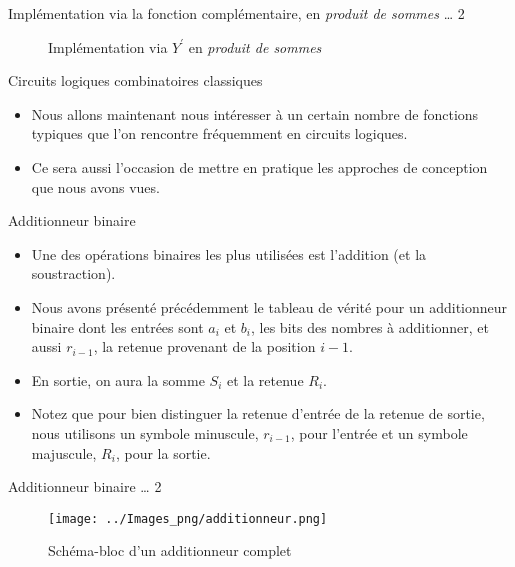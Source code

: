 \documentclass[presentation]{beamer}
\begin{document}
\begin{frame}[label={sec:orgec8a9b9}]{Implémentation via la fonction complémentaire, en \emph{produit de sommes} \ldots{} 2}
\begin{figure}[htbp]
\centering

\caption{\label{fig:org5e15c6f}Implémentation via \(Y^\prime\) en \emph{produit de sommes}}
\end{figure} 
\end{frame}

\begin{frame}[label={sec:org08b1494}]{Circuits logiques combinatoires classiques}
\begin{itemize}
\item Nous allons maintenant nous intéresser à un certain nombre de fonctions typiques que l'on rencontre fréquemment en circuits logiques.

\item Ce sera aussi l'occasion de mettre en pratique les approches de conception que nous avons vues.
\end{itemize}
\end{frame}


\begin{frame}[label={sec:org8f378cb}]{Additionneur binaire}
\begin{itemize}
\item Une des opérations binaires les plus utilisées est l'addition (et la soustraction).

\item Nous avons présenté précédemment le tableau de vérité pour un additionneur binaire dont les entrées sont \(a_{i}\) et \(b_{i}\), les bits des nombres à additionner, et aussi \(r_{i-1}\), la retenue provenant de la position \(i-1\).

\item En sortie, on aura la somme \(S_{i}\) et la retenue \(R_{i}\).

\item Notez que pour bien distinguer la retenue d'entrée de la retenue de sortie, nous utilisons un symbole minuscule, \(r_{i-1}\), pour l'entrée et un symbole majuscule, \(R_{i}\), pour la sortie.
\end{itemize}
\end{frame}

\begin{frame}[label={sec:org6b471bd}]{Additionneur binaire \ldots{} 2}
\begin{figure}[htbp]
\centering
\texttt{[image: ../Images\_png/additionneur.png]}
\caption{\label{fig:orgba33ed4}Schéma-bloc d'un additionneur complet}
\end{figure}
\end{frame}
\end{document}
